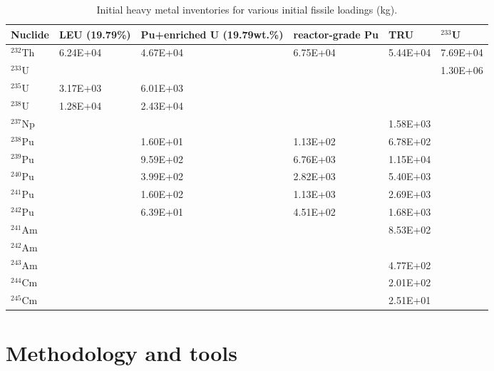 \begin{table}  %
	\caption{Initial heavy metal inventories for 
	various initial fissile loadings (kg).}
	\vspace{0.1in}
	\begin{tabularx}{\textwidth}{X X p{} 
	p{} X X}
		\hline
		Nuclide & \gls{LEU} (19.79\%) & Pu+enriched U (19.79wt.\%) &  
		reactor-grade Pu & \gls{TRU}& $^{233}$U \\	\hline
		$^{232}$Th       &6.24E+04 & 4.67E+04 &   6.75E+04			& 5.44E+04	& 7.69E+04    \\ 
		$^{233}$U        &         & &        &       &  1.30E+06 \\
		$^{235}$U        & 3.17E+03 &6.01E+03	&            &   & \\
		$^{238}$U      	 &1.28E+04  &2.43E+04 &	&  &\\
		$^{237}$Np	  	 &         && &1.58E+03	&    \\
		$^{238}$Pu	  	 &         &1.60E+01	& 1.13E+02 & 6.78E+02	&   \\
		$^{239}$Pu       &         &9.59E+02&6.76E+03& 1.15E+04&    \\
		$^{240}$Pu       &         &3.99E+02& 2.82E+03&5.40E+03&  	\\  
		$^{241}$Pu		 &         &1.60E+02&1.13E+03&2.69E+03&   \\
		$^{242}$Pu		 &         &6.39E+01	&4.51E+02	& 1.68E+03& \\
		$^{241}$Am		 &         &&& 8.53E+02 & \\
		$^{242}$Am		 &         &&&  &\\
		$^{243}$Am       &        & &&4.77E+02&\\
		$^{244}$Cm		 &        & &&2.01E+02&  \\
		$^{245}$Cm		 &        & &&			2.51E+01	&   \\ 
		\hline
	\end{tabularx}
\label{tab:table5}
\end{table}


\section{Methodology and tools} \label{Methodology-and-tools}


